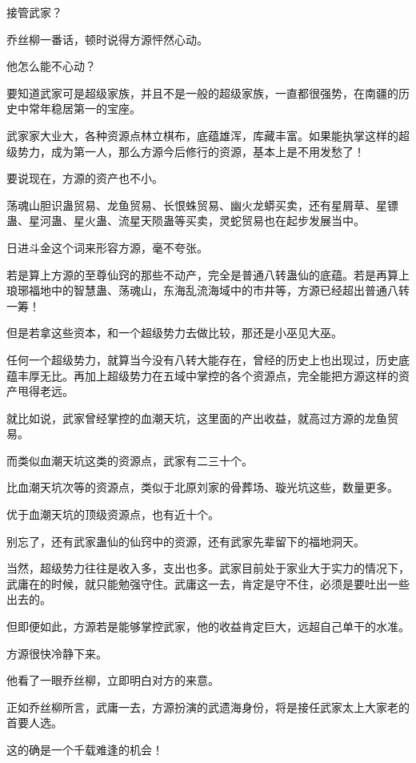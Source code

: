 
\begin{this_body}

接管武家？

乔丝柳一番话，顿时说得方源怦然心动。

他怎么能不心动？

要知道武家可是超级家族，并且不是一般的超级家族，一直都很强势，在南疆的历史中常年稳居第一的宝座。

武家家大业大，各种资源点林立棋布，底蕴雄浑，库藏丰富。如果能执掌这样的超级势力，成为第一人，那么方源今后修行的资源，基本上是不用发愁了！

要说现在，方源的资产也不小。

荡魂山胆识蛊贸易、龙鱼贸易、长恨蛛贸易、幽火龙蟒买卖，还有星屑草、星镖蛊、星河蛊、星火蛊、流星天陨蛊等买卖，灵蛇贸易也在起步发展当中。

日进斗金这个词来形容方源，毫不夸张。

若是算上方源的至尊仙窍的那些不动产，完全是普通八转蛊仙的底蕴。若是再算上琅琊福地中的智慧蛊、荡魂山，东海乱流海域中的市井等，方源已经超出普通八转一筹！

但是若拿这些资本，和一个超级势力去做比较，那还是小巫见大巫。

任何一个超级势力，就算当今没有八转大能存在，曾经的历史上也出现过，历史底蕴丰厚无比。再加上超级势力在五域中掌控的各个资源点，完全能把方源这样的资产甩得老远。

就比如说，武家曾经掌控的血潮天坑，这里面的产出收益，就高过方源的龙鱼贸易。

而类似血潮天坑这类的资源点，武家有二三十个。

比血潮天坑次等的资源点，类似于北原刘家的骨葬场、璇光坑这些，数量更多。

优于血潮天坑的顶级资源点，也有近十个。

别忘了，还有武家蛊仙的仙窍中的资源，还有武家先辈留下的福地洞天。

当然，超级势力往往是收入多，支出也多。武家目前处于家业大于实力的情况下，武庸在的时候，就只能勉强守住。武庸这一去，肯定是守不住，必须是要吐出一些出去的。

但即便如此，方源若是能够掌控武家，他的收益肯定巨大，远超自己单干的水准。

方源很快冷静下来。

他看了一眼乔丝柳，立即明白对方的来意。

正如乔丝柳所言，武庸一去，方源扮演的武遗海身份，将是接任武家太上大家老的首要人选。

这的确是一个千载难逢的机会！


\end{this_body}
